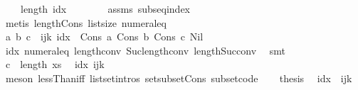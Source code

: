 \begin{isabellebody}
\ \ \ \ {\isachardoublequoteopen}length\ idx\ {\isacharequal}{\kern0pt}\ {}{\isachardoublequoteclose}\isanewline
\ \ \ \ \isamarkupfalse%
\ assms\ subseq{\isacharunderscore}{\kern0pt}index\isanewline
\ \ \ \ \isamarkupfalse%
\ {\isacharparenleft}{\kern0pt}metis\ length{\isacharunderscore}{\kern0pt}Cons\ list{\isachardot}{\kern0pt}size{\isacharparenleft}{\kern0pt}{}{\isacharparenright}{\kern0pt}\ numeral{\isacharunderscore}{\kern0pt}{}{\isacharunderscore}{\kern0pt}eq{\isacharunderscore}{\kern0pt}{}{\isacharparenright}{\kern0pt}\isanewline
\ \ \isamarkupfalse%
\ a\ b\ c\ \ ijk{\isacharcolon}{\kern0pt}\ {\isachardoublequoteopen}idx\ {\isacharequal}{\kern0pt}\ Cons\ a\ {\isacharparenleft}{\kern0pt}Cons\ b\ {\isacharparenleft}{\kern0pt}Cons\ c\ Nil{\isacharparenright}{\kern0pt}{\isacharparenright}{\kern0pt}{\isachardoublequoteclose}\ \isanewline
\ \ \ \ \isamarkupfalse%
\ idx{\isacharparenleft}{\kern0pt}{}{\isacharparenright}{\kern0pt}\ numeral{\isacharunderscore}{\kern0pt}{}{\isacharunderscore}{\kern0pt}eq{\isacharunderscore}{\kern0pt}{}\ length{\isacharunderscore}{\kern0pt}{}{\isacharunderscore}{\kern0pt}conv\ Suc{\isacharunderscore}{\kern0pt}length{\isacharunderscore}{\kern0pt}conv\ length{\isacharunderscore}{\kern0pt}Suc{\isacharunderscore}{\kern0pt}conv\ \isamarkupfalse%
\ smt\isanewline
\ \ \isamarkupfalse%
\ {}{\isacharcolon}{\kern0pt}{\isachardoublequoteopen}c\ {\isacharless}{\kern0pt}\ length\ xs{\isachardoublequoteclose}\ \isamarkupfalse%
\ idx\ ijk\isanewline
\ \ \ \ \isamarkupfalse%
\ {\isacharparenleft}{\kern0pt}meson\ lessThan{\isacharunderscore}{\kern0pt}iff\ list{\isachardot}{\kern0pt}set{\isacharunderscore}{\kern0pt}intros{\isacharparenleft}{\kern0pt}{}{\isacharparenright}{\kern0pt}\ set{\isacharunderscore}{\kern0pt}subset{\isacharunderscore}{\kern0pt}Cons\ subset{\isacharunderscore}{\kern0pt}code{\isacharparenleft}{\kern0pt}{}{\isacharparenright}{\kern0pt}{\isacharparenright}{\kern0pt}\isanewline
\ \ \isamarkupfalse%
\ {\isacharquery}{\kern0pt}thesis\ \isamarkupfalse%
\ idx{\isacharparenleft}{\kern0pt}{}{\isacharcomma}{\kern0pt}{}{\isacharparenright}{\kern0pt}\ {\isachardoublequoteopen}{}{\isachardoublequoteclose}\ ijk\ \isamarkupfalse%

\end{isabellebody}
